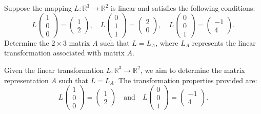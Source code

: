 \documentclass{report}
\begin{document}
Suppose the mapping $L:\mathbb{R}^3 \to \mathbb{R}^2$ is linear and satisfies the following conditions:
\[
L\left(\begin{array}{c}
1 \\
0 \\
0
\end{array}\right) = \left(\begin{array}{c}
1 \\
2
\end{array}\right), \quad
L\left(\begin{array}{c}
0 \\
1 \\
1
\end{array}\right) = \left(\begin{array}{c}
2 \\
0
\end{array}\right), \quad
L\left(\begin{array}{c}
0 \\
0 \\
1
\end{array}\right) = \left(\begin{array}{r}
-1 \\
4
\end{array}\right).
\]
Determine the $2 \times 3$ matrix $A$ such that $L = L_A$, where $L_A$ represents the linear transformation associated with matrix $A$.\\


\sol

Given the linear transformation $L: \mathbb{R}^3 \to \mathbb{R}^2$, we aim to determine the matrix representation $A$ such that $L = L_A$. The transformation properties provided are:
\[
L\left(\begin{array}{c} 1 \\ 0 \\ 0 \end{array}\right) = \left(\begin{array}{c} 1 \\ 2 \end{array}\right) \quad \text{and} \quad L\left(\begin{array}{c} 0 \\ 0 \\ 1 \end{array}\right) = \left(\begin{array}{r} -1 \\ 4 \end{array}\right).
\]
\end{document}
